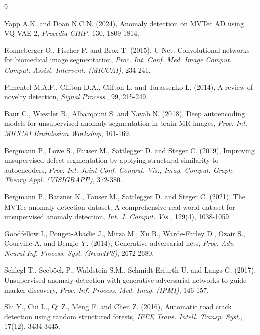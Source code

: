 \documentclass[twoside]{article}
\begin{document}
\begin{thebibliography}{9}
	
	Yapp A.K. and Doan N.C.N. (2024), Anomaly detection on MVTec AD using VQ-VAE-2, {\it Procedia CIRP}, 130, 1809-1814.
	
	Ronneberger O., Fischer P. and Brox T. (2015), U-Net: Convolutional networks for biomedical image segmentation, {\it Proc. Int. Conf. Med. Image Comput. Comput.-Assist. Intervent. (MICCAI)}, 234-241.
	
	Pimentel M.A.F., Clifton D.A., Clifton L. and Tarassenko L. (2014), A review of novelty detection, {\it Signal Process.}, 99, 215-249.
	
	Baur C., Wiestler B., Albarqouni S. and Navab N. (2018), Deep autoencoding models for unsupervised anomaly segmentation in brain MR images, {\it Proc. Int. MICCAI Brainlesion Workshop}, 161-169.
	
	Bergmann P., L\"owe S., Fauser M., Sattlegger D. and Steger C. (2019), Improving unsupervised defect segmentation by applying structural similarity to autoencoders, {\it Proc. Int. Joint Conf. Comput. Vis., Imag. Comput. Graph. Theory Appl. (VISIGRAPP)}, 372-380.
	
	Bergmann P., Batzner K., Fauser M., Sattlegger D. and Steger C. (2021), The MVTec anomaly detection dataset: A comprehensive real-world dataset for unsupervised anomaly detection, {\it Int. J. Comput. Vis.}, 129(4), 1038-1059.
	
	Goodfellow I., Pouget-Abadie J., Mirza M., Xu B., Warde-Farley D., Ozair S., Courville A. and Bengio Y. (2014), Generative adversarial nets, {\it Proc. Adv. Neural Inf. Process. Syst. (NeurIPS)}, 2672-2680.
	
	Schlegl T., Seeb\"ock P., Waldstein S.M., Schmidt-Erfurth U. and Langs G. (2017), Unsupervised anomaly detection with generative adversarial networks to guide marker discovery, {\it Proc. Inf. Process. Med. Imag. (IPMI)}, 146-157.
	
	Shi Y., Cui L., Qi Z., Meng F. and Chen Z. (2016), Automatic road crack detection using random structured forests, {\it IEEE Trans. Intell. Transp. Syst.}, 17(12), 3434-3445.
	

\end{thebibliography}
\end{document}
